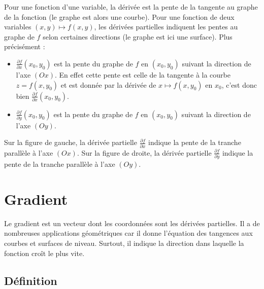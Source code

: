 \documentclass[11pt,class=report,crop=false]{standalone}
\begin{document}
Pour une fonction d'une variable, la dérivée est la pente de la tangente au graphe de la fonction (le graphe est alors une courbe). Pour une fonction de deux variables $(x,y) \mapsto f(x,y)$, les dérivées partielles indiquent les pentes au graphe de $f$ selon certaines directions (le graphe est ici une surface). Plus précisément :

\begin{itemize}
  \item $\frac{\partial f}{\partial x} (x_0,y_0)$ est la pente du graphe de $f$
 en $(x_0,y_0)$ suivant la direction de l'axe $(Ox)$.
 En effet cette pente est celle de la tangente à la courbe $z = f(x,y_0)$ et est donnée par la dérivée de $x \mapsto f(x,y_0)$ en $x_0$, c'est donc bien $\frac{\partial f}{\partial x} (x_0,y_0)$.
 
 \item $\frac{\partial f}{\partial y} (x_0,y_0)$ est la pente du graphe de $f$
 en $(x_0,y_0)$ suivant la direction de l'axe $(Oy)$.
 

\end{itemize}

 
 
\bigskip 
Sur la figure de gauche, la dérivée partielle  $\frac{\partial f}{\partial x}$ indique la pente de la tranche parallèle à l'axe $(Ox)$. Sur la figure de droite, la dérivée partielle  $\frac{\partial f}{\partial y}$ indique la pente de la tranche parallèle à l'axe $(Oy)$.







\section{Gradient}

Le gradient est un vecteur dont les coordonnées sont les dérivées partielles. Il a de nombreuses applications géométriques car il donne l'équation des tangences aux courbes et surfaces de niveau. Surtout, il indique la direction dans laquelle la fonction croît le plus vite.

\subsection{Définition}
\end{document}
